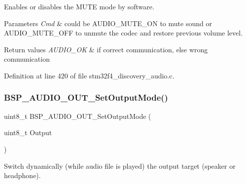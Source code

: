 Enables or disables the M\+U\+TE mode by software. 


\begin{DoxyParams}{Parameters}
{\em Cmd} & could be A\+U\+D\+I\+O\+\_\+\+M\+U\+T\+E\+\_\+\+ON to mute sound or A\+U\+D\+I\+O\+\_\+\+M\+U\+T\+E\+\_\+\+O\+FF to unmute the codec and restore previous volume level. \\
\hline
\end{DoxyParams}

\begin{DoxyRetVals}{Return values}
{\em A\+U\+D\+I\+O\+\_\+\+OK} & if correct communication, else wrong communication \\
\hline
\end{DoxyRetVals}


Definition at line 420 of file stm32f4\+\_\+discovery\+\_\+audio.\+c.

\mbox{\label{group___s_t_m32_f4___d_i_s_c_o_v_e_r_y___a_u_d_i_o___o_u_t___private___functions_gacd0d9e6eb0ff2569cf6c4b92fc359484}} 
\subsubsection{\texorpdfstring{B\+S\+P\+\_\+\+A\+U\+D\+I\+O\+\_\+\+O\+U\+T\+\_\+\+Set\+Output\+Mode()}{BSP\_AUDIO\_OUT\_SetOutputMode()}}
{\footnotesize\ttfamily uint8\+\_\+t B\+S\+P\+\_\+\+A\+U\+D\+I\+O\+\_\+\+O\+U\+T\+\_\+\+Set\+Output\+Mode (\begin{DoxyParamCaption}\item[{uint8\+\_\+t}]{Output }\end{DoxyParamCaption})}



Switch dynamically (while audio file is played) the output target (speaker or headphone). 

